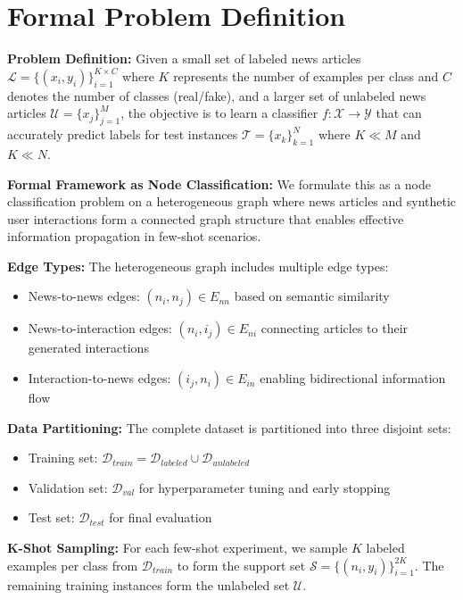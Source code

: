 \section{Formal Problem Definition}

\textbf{Problem Definition:} Given a small set of labeled news articles $\mathcal{L} = \{(x_i, y_i)\}_{i=1}^{K \times C}$ where $K$ represents the number of examples per class and $C$ denotes the number of classes (real/fake), and a larger set of unlabeled news articles $\mathcal{U} = \{x_j\}_{j=1}^{M}$, the objective is to learn a classifier $f: \mathcal{X} \rightarrow \mathcal{Y}$ that can accurately predict labels for test instances $\mathcal{T} = \{x_k\}_{k=1}^{N}$ where $K \ll M$ and $K \ll N$.

\textbf{Formal Framework as Node Classification:} We formulate this as a node classification problem on a heterogeneous graph where news articles and synthetic user interactions form a connected graph structure that enables effective information propagation in few-shot scenarios.

\textbf{Edge Types:} The heterogeneous graph includes multiple edge types:
\begin{itemize}
\item News-to-news edges: $(n_i, n_j) \in E_{nn}$ based on semantic similarity
\item News-to-interaction edges: $(n_i, i_j) \in E_{ni}$ connecting articles to their generated interactions  
\item Interaction-to-news edges: $(i_j, n_i) \in E_{in}$ enabling bidirectional information flow
\end{itemize}

\textbf{Data Partitioning:} The complete dataset is partitioned into three disjoint sets:
\begin{itemize}
\item Training set: $\mathcal{D}_{train} = \mathcal{D}_{labeled} \cup \mathcal{D}_{unlabeled}$
\item Validation set: $\mathcal{D}_{val}$ for hyperparameter tuning and early stopping
\item Test set: $\mathcal{D}_{test}$ for final evaluation
\end{itemize}

\textbf{K-Shot Sampling:} For each few-shot experiment, we sample $K$ labeled examples per class from $\mathcal{D}_{train}$ to form the support set $\mathcal{S} = \{(n_i, y_i)\}_{i=1}^{2K}$. The remaining training instances form the unlabeled set $\mathcal{U}$.

